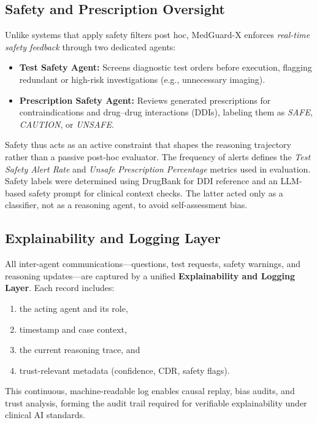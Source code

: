 \documentclass[letterpaper]{article} %
\begin{document}
\subsection{Safety and Prescription Oversight}

Unlike systems that apply safety filters post hoc, MedGuard-X enforces \textit{real-time safety feedback} through two dedicated agents:

\begin{itemize}
    \item \textbf{Test Safety Agent:} Screens diagnostic test orders before execution, flagging redundant or high-risk investigations (e.g., unnecessary imaging).
    \item \textbf{Prescription Safety Agent:} Reviews generated prescriptions for contraindications and drug–drug interactions (DDIs), labeling them as \textit{SAFE}, \textit{CAUTION}, or \textit{UNSAFE}.
\end{itemize}

Safety thus acts as an active constraint that shapes the reasoning trajectory rather than a passive post-hoc evaluator. 
The frequency of alerts defines the \textit{Test Safety Alert Rate} and \textit{Unsafe Prescription Percentage} metrics used in evaluation.
Safety labels were determined using DrugBank \cite{wishart2018drugbank} for DDI reference and an LLM-based safety prompt for clinical context checks.
The latter acted only as a classifier, not as a reasoning agent, to avoid self-assessment bias.


\subsection{Explainability and Logging Layer}

All inter-agent communications—questions, test requests, safety warnings, and reasoning updates—are captured by a unified \textbf{Explainability and Logging Layer}. 
Each record includes:
\begin{enumerate}
    \item the acting agent and its role,
    \item timestamp and case context,
    \item the current reasoning trace, and
    \item trust-relevant metadata (confidence, CDR, safety flags).
\end{enumerate}
This continuous, machine-readable log enables causal replay, bias audits, and trust analysis, forming the audit trail required for verifiable explainability under clinical AI standards.
\end{document}

